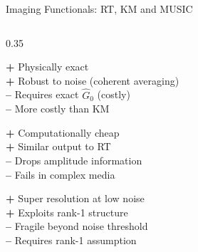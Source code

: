 \documentclass{beamer}
\begin{document}
\begin{frame}{Imaging Functionals: RT, KM and MUSIC}
\begin{minipage}{\dimexpr\textwidth+0.7cm\relax}
\begin{columns}[T]
  \begin{column}{0.35\textwidth}
    \begin{tcolorbox}[keybox, title=, top=2pt, bottom=2pt]
      \scriptsize
      \textcolor{greenok}{\textbf{+}} Physically exact\\
      \textcolor{greenok}{\textbf{+}} Robust to noise (coherent averaging)\\
      \textcolor{CSred}{\textbf{--}} Requires exact $\hat{G}_0$ (costly) \\
      \textcolor{CSred}{\textbf{--}} More costly than KM
    \end{tcolorbox}


    \begin{tcolorbox}[warnbox, title=, top=2pt, bottom=2pt] 
      \scriptsize
      \textcolor{greenok}{\textbf{+}} Computationally cheap\\
      \textcolor{greenok}{\textbf{+}} Similar output to RT \\
      \textcolor{CSred}{\textbf{--}} Drops amplitude information\\
      \textcolor{CSred}{\textbf{--}} Fails in complex media
    \end{tcolorbox}


    \begin{tcolorbox}[resultbox, title=, top=2pt, bottom=2pt]
      \scriptsize
      \textcolor{greenok}{\textbf{+}} Super resolution at low noise\\
      \textcolor{greenok}{\textbf{+}} Exploits rank-1 structure\\
      \textcolor{CSred}{\textbf{--}} Fragile beyond noise threshold\\
      \textcolor{CSred}{\textbf{--}} Requires rank-1 assumption
    \end{tcolorbox}
  \end{column}
  \end{columns} 
  \end{minipage} 
\end{frame}
\end{document}
